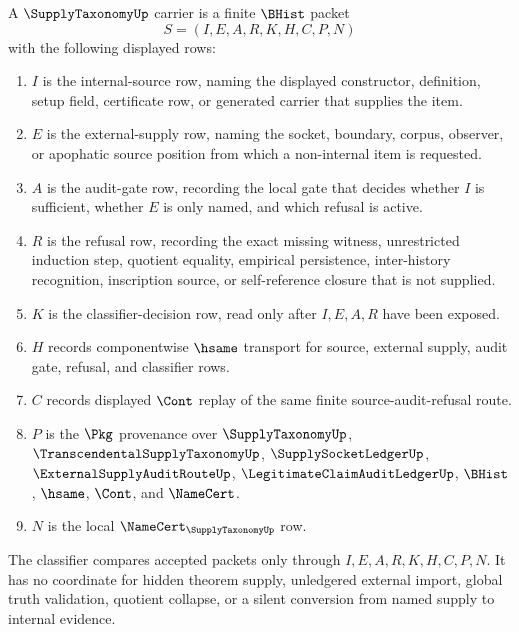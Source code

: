 \begin{definition}
\label{def:supply-taxonomy-carrier}
A $\SupplyTaxonomyUp$ carrier is a finite $\BHist$ packet
$$
S=(I,E,A,R,K,H,C,P,N)
$$
with the following displayed rows:
\begin{enumerate}
\item $I$ is the internal-source row, naming the displayed constructor, definition, setup field, certificate row, or generated carrier that supplies the item.
\item $E$ is the external-supply row, naming the socket, boundary, corpus, observer, or apophatic source position from which a non-internal item is requested.
\item $A$ is the audit-gate row, recording the local gate that decides whether $I$ is sufficient, whether $E$ is only named, and which refusal is active.
\item $R$ is the refusal row, recording the exact missing witness, unrestricted induction step, quotient equality, empirical persistence, inter-history recognition, inscription source, or self-reference closure that is not supplied.
\item $K$ is the classifier-decision row, read only after $I,E,A,R$ have been exposed.
\item $H$ records componentwise $\hsame$ transport for source, external supply, audit gate, refusal, and classifier rows.
\item $C$ records displayed $\Cont$ replay of the same finite source-audit-refusal route.
\item $P$ is the $\Pkg$ provenance over $\SupplyTaxonomyUp$, $\TranscendentalSupplyTaxonomyUp$, $\SupplySocketLedgerUp$, $\ExternalSupplyAuditRouteUp$, $\LegitimateClaimAuditLedgerUp$, $\BHist$, $\hsame$, $\Cont$, and $\NameCert$.
\item $N$ is the local $\NameCert_{\SupplyTaxonomyUp}$ row.
\end{enumerate}
The classifier compares accepted packets only through $I,E,A,R,K,H,C,P,N$. It has no coordinate for hidden theorem supply, unledgered external import, global truth validation, quotient collapse, or a silent conversion from named supply to internal evidence.
\end{definition}

